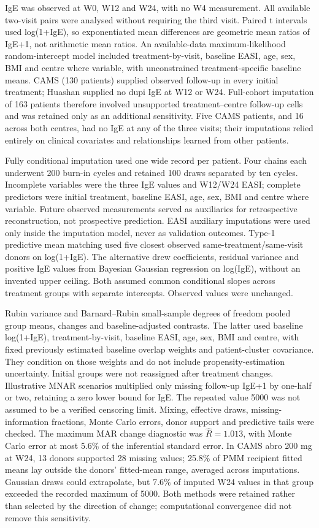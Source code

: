 \documentclass[10pt,a4paper]{article}
\begin{document}
IgE was observed at W0, W12 and W24, with no W4 measurement. All available two-visit pairs were analysed without requiring the third visit. Paired t intervals used log(1+IgE), so exponentiated mean differences are geometric mean ratios of IgE+1, not arithmetic mean ratios. An available-data maximum-likelihood random-intercept model included treatment-by-visit, baseline EASI, age, sex, BMI and centre where variable, with unconstrained treatment-specific baseline means. CAMS (130 patients) supplied observed follow-up in every initial treatment; Huashan supplied no dupi IgE at W12 or W24. Full-cohort imputation of 163 patients therefore involved unsupported treatment--centre follow-up cells and was retained only as an additional sensitivity. Five CAMS patients, and 16 across both centres, had no IgE at any of the three visits; their imputations relied entirely on clinical covariates and relationships learned from other patients.

Fully conditional imputation used one wide record per patient. Four chains each underwent 200 burn-in cycles and retained 100 draws separated by ten cycles. Incomplete variables were the three IgE values and W12/W24 EASI; complete predictors were initial treatment, baseline EASI, age, sex, BMI and centre where variable. Future observed measurements served as auxiliaries for retrospective reconstruction, not prospective prediction. EASI auxiliary imputations were used only inside the imputation model, never as validation outcomes. Type-1 predictive mean matching used five closest observed same-treatment/same-visit donors on log(1+IgE). The alternative drew coefficients, residual variance and positive IgE values from Bayesian Gaussian regression on log(IgE), without an invented upper ceiling. Both assumed common conditional slopes across treatment groups with separate intercepts. Observed values were unchanged.

Rubin variance and Barnard--Rubin small-sample degrees of freedom pooled group means, changes and baseline-adjusted contrasts. The latter used baseline log(1+IgE), treatment-by-visit, baseline EASI, age, sex, BMI and centre, with fixed previously estimated baseline overlap weights and patient-cluster covariance. They condition on those weights and do not include propensity-estimation uncertainty. Initial groups were not reassigned after treatment changes. Illustrative MNAR scenarios multiplied only missing follow-up IgE+1 by one-half or two, retaining a zero lower bound for IgE. The repeated value 5000 was not assumed to be a verified censoring limit. Mixing, effective draws, missing-information fractions, Monte Carlo errors, donor support and predictive tails were checked. The maximum MAR change diagnostic was $\widehat R=1.013$, with Monte Carlo error at most 5.6\% of the inferential standard error. In CAMS abro 200 mg at W24, 13 donors supported 28 missing values; 25.8\% of PMM recipient fitted means lay outside the donors' fitted-mean range, averaged across imputations. Gaussian draws could extrapolate, but 7.6\% of imputed W24 values in that group exceeded the recorded maximum of 5000. Both methods were retained rather than selected by the direction of change; computational convergence did not remove this sensitivity.\citep{sterne2009mi,wijesuriya2025longitudinal}
\end{document}

